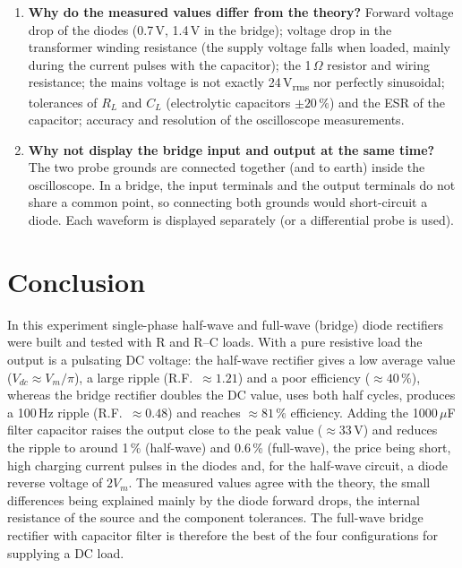 \documentclass[11pt,a4paper]{article}
\begin{document}
\begin{enumerate}[leftmargin=*]
\item \textbf{Why do the measured values differ from the theory?}
Forward voltage drop of the diodes (0.7\,V, 1.4\,V in the bridge); voltage drop in the
transformer winding resistance (the supply voltage falls when loaded, mainly during the
current pulses with the capacitor); the 1\,$\Omega$ resistor and wiring resistance;
the mains voltage is not exactly 24\,V\textsubscript{rms} nor perfectly sinusoidal;
tolerances of $R_L$ and $C_L$ (electrolytic capacitors $\pm20\,\%$) and the ESR of the
capacitor; accuracy and resolution of the oscilloscope measurements.

\item \textbf{Why not display the bridge input and output at the same time?}
The two probe grounds are connected together (and to earth) inside the oscilloscope.
In a bridge, the input terminals and the output terminals do not share a common point,
so connecting both grounds would short-circuit a diode. Each waveform is displayed
separately (or a differential probe is used).
\end{enumerate}

\section{Conclusion}
In this experiment single-phase half-wave and full-wave (bridge) diode rectifiers were
built and tested with R and R--C loads. With a pure resistive load the output is a
pulsating DC voltage: the half-wave rectifier gives a low average value
($V_{dc}\approx V_m/\pi$), a large ripple (R.F.\ $\approx1.21$) and a poor efficiency
($\approx40\,\%$), whereas the bridge rectifier doubles the DC value, uses both half
cycles, produces a 100\,Hz ripple (R.F.\ $\approx0.48$) and reaches $\approx81\,\%$
efficiency. Adding the 1000\,$\mu$F filter capacitor raises the output close to the peak
value ($\approx33$\,V) and reduces the ripple to around 1\,\% (half-wave) and 0.6\,\%
(full-wave), the price being short, high charging current pulses in the diodes and, for
the half-wave circuit, a diode reverse voltage of $2V_m$. The measured values agree with
the theory, the small differences being explained mainly by the diode forward drops,
the internal resistance of the source and the component tolerances. The full-wave
bridge rectifier with capacitor filter is therefore the best of the four configurations
for supplying a DC load.
\end{document}
